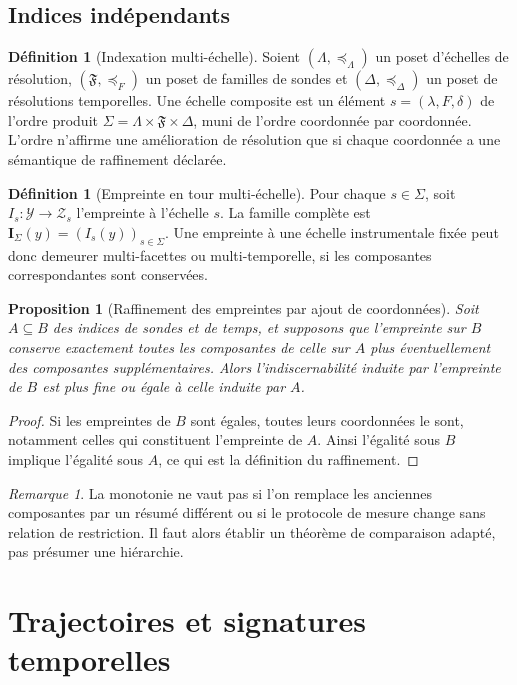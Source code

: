 \documentclass[11pt,oneside]{book}
\newtheorem{proposition}[theoreme]{Proposition}
\theoremstyle{definition}
\newtheorem{definition}[theoreme]{Définition}
\theoremstyle{remark}
\newtheorem{remarque}[theoreme]{Remarque}
\newcommand{\Y}{\mathcal Y}
\newcommand{\Z}{\mathcal Z}
\newcommand{\1}{\mathbf 1}
\begin{document}
\section{Indices indépendants}
\begin{definition}[Indexation multi-échelle]
Soient \((\Lambda,\preceq_\Lambda)\) un poset d'échelles de résolution, \((\mathfrak F,\preceq_F)\) un poset de familles de sondes et \((\Delta,\preceq_\Delta)\) un poset de résolutions temporelles. Une échelle composite est un élément \(s=(\lambda,F,\delta)\) de l'ordre produit \(\Sigma=\Lambda\times\mathfrak F\times\Delta\), muni de l'ordre coordonnée par coordonnée. L'ordre n'affirme une amélioration de résolution que si chaque coordonnée a une sémantique de raffinement déclarée.
\end{definition}
\begin{definition}[Empreinte en tour multi-échelle]
Pour chaque \(s\in\Sigma\), soit \(I_s:\Y\to\Z_s\) l'empreinte à l'échelle \(s\). La famille complète est \(\mathbf I_\Sigma(y)=(I_s(y))_{s\in\Sigma}\). Une empreinte à une échelle instrumentale fixée peut donc demeurer multi-facettes ou multi-temporelle, si les composantes correspondantes sont conservées.
\end{definition}
\begin{proposition}[Raffinement des empreintes par ajout de coordonnées]
Soit \(A\subseteq B\) des indices de sondes et de temps, et supposons que l'empreinte sur \(B\) conserve exactement toutes les composantes de celle sur \(A\) plus éventuellement des composantes supplémentaires. Alors l'indiscernabilité induite par l'empreinte de \(B\) est plus fine ou égale à celle induite par \(A\).
\end{proposition}
\begin{proof}
Si les empreintes de \(B\) sont égales, toutes leurs coordonnées le sont, notamment celles qui constituent l'empreinte de \(A\). Ainsi l'égalité sous \(B\) implique l'égalité sous \(A\), ce qui est la définition du raffinement.\end{proof}
\begin{remarque}
La monotonie ne vaut pas si l'on remplace les anciennes composantes par un résumé différent ou si le protocole de mesure change sans relation de restriction. Il faut alors établir un théorème de comparaison adapté, pas présumer une hiérarchie.
\end{remarque}

\chapter{Trajectoires et signatures temporelles}
\end{document}
